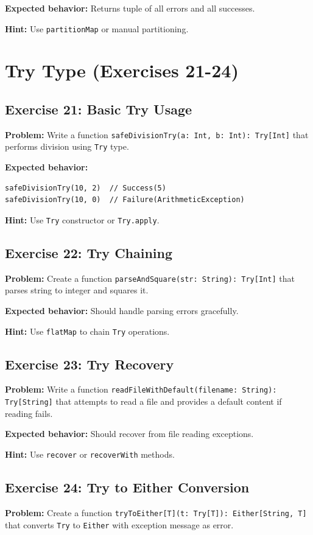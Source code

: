 \documentclass[12pt,a4paper]{article}
\begin{document}
\textbf{Expected behavior:} Returns tuple of all errors and all successes.

\textbf{Hint:} Use \texttt{partitionMap} or manual partitioning.

\section{Try Type (Exercises 21-24)}

\subsection{Exercise 21: Basic Try Usage}
\textbf{Problem:} Write a function \texttt{safeDivisionTry(a: Int, b: Int): Try[Int]} that performs division using \texttt{Try} type.

\textbf{Expected behavior:}
\begin{lstlisting}
safeDivisionTry(10, 2)  // Success(5)
safeDivisionTry(10, 0)  // Failure(ArithmeticException)
\end{lstlisting}

\textbf{Hint:} Use \texttt{Try} constructor or \texttt{Try.apply}.

\subsection{Exercise 22: Try Chaining}
\textbf{Problem:} Create a function \texttt{parseAndSquare(str: String): Try[Int]} that parses string to integer and squares it.

\textbf{Expected behavior:} Should handle parsing errors gracefully.

\textbf{Hint:} Use \texttt{flatMap} to chain \texttt{Try} operations.

\subsection{Exercise 23: Try Recovery}
\textbf{Problem:} Write a function \texttt{readFileWithDefault(filename: String): Try[String]} that attempts to read a file and provides a default content if reading fails.

\textbf{Expected behavior:} Should recover from file reading exceptions.

\textbf{Hint:} Use \texttt{recover} or \texttt{recoverWith} methods.

\subsection{Exercise 24: Try to Either Conversion}
\textbf{Problem:} Create a function \texttt{tryToEither[T](t: Try[T]): Either[String, T]} that converts \texttt{Try} to \texttt{Either} with exception message as error.
\end{document}
